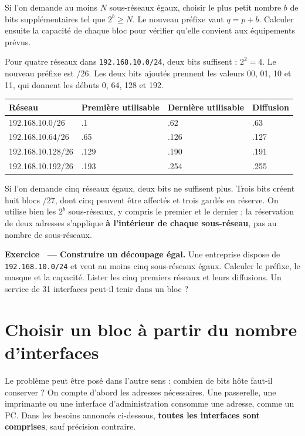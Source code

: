 \documentclass[11pt,a4paper]{article}
\newif\ifcorrige
\newcommand{\ip}[1]{\textcolor{ipred}{\texttt{#1}}}
\newcounter{exo}
\newcommand{\exo}[2]{%
  \Needspace{6cm}\stepcounter{exo}\begin{quest}\textbf{Exercice \theexo\ — #1.} #2\end{quest}}
\newcommand{\zone}[2]{%
  \ifcorrige
    \begin{tcolorbox}[colback=corrbg,colframe=corr,boxrule=0.6pt,arc=1pt,left=5pt,right=5pt,
      fontupper=\small\color{corr}]#2\end{tcolorbox}%
  \else
    \begin{tcolorbox}[colback=white,colframe=black!45,boxrule=0.5pt,arc=1pt,height=#1]\end{tcolorbox}%
  \fi}
\begin{document}
\begin{methode}
Si l'on demande au moins $N$ sous-réseaux égaux, choisir le plus petit nombre $b$ de bits
supplémentaires tel que $2^b\geq N$. Le nouveau préfixe vaut $q=p+b$.
Calculer ensuite la capacité de chaque bloc pour vérifier qu'elle convient aux équipements prévus.
\end{methode}

Pour quatre réseaux dans \ip{192.168.10.0/24}, deux bits suffisent :
$2^2=4$. Le nouveau préfixe est /26. Les deux bits ajoutés prennent les valeurs
00, 01, 10 et 11, qui donnent les débuts 0, 64, 128 et 192.
\begin{center}\small
\begin{tabular}{@{}llll@{}}
\toprule
Réseau & Première utilisable & Dernière utilisable & Diffusion\\
\midrule
192.168.10.0/26 & .1 & .62 & .63\\
192.168.10.64/26 & .65 & .126 & .127\\
192.168.10.128/26 & .129 & .190 & .191\\
192.168.10.192/26 & .193 & .254 & .255\\
\bottomrule
\end{tabular}
\end{center}
Si l'on demande cinq réseaux égaux, deux bits ne suffisent plus. Trois bits créent huit blocs /27,
dont cinq peuvent être affectés et trois gardés en réserve.
On utilise bien les $2^b$ sous-réseaux, y compris le premier et le dernier ; la réservation de deux
adresses s'applique \textbf{à l'intérieur de chaque sous-réseau}, pas au nombre de sous-réseaux.

\exo{Construire un découpage égal}{Une entreprise dispose de \ip{192.168.10.0/24}
et veut au moins cinq sous-réseaux égaux. Calculer le préfixe, le masque et la capacité.
Lister les cinq premiers réseaux et leurs diffusions. Un service de 31 interfaces peut-il tenir dans un bloc ?}
\zone{3cm}{$2^2<5\leq2^3$ : 3 bits supplémentaires, /27, masque \ip{255.255.255.224},
8 blocs de 30 adresses utilisables. Réseaux/diffusions : .0/.31 ; .32/.63 ; .64/.95 ; .96/.127 ; .128/.159.
31 interfaces dépassent la capacité de 30 : ce découpage ne satisfait pas ce service.
Il faut revoir le plan, par exemple en utilisant des blocs de tailles différentes.}

\Needspace{6cm}
\section{Choisir un bloc à partir du nombre d'interfaces}
Le problème peut être posé dans l'autre sens : combien de bits hôte faut-il conserver ?
On compte d'abord les adresses nécessaires. Une passerelle, une imprimante ou une interface
d'administration consomme une adresse, comme un PC.
Dans les besoins annoncés ci-dessous, \textbf{toutes les interfaces sont comprises}, sauf précision contraire.
\end{document}
